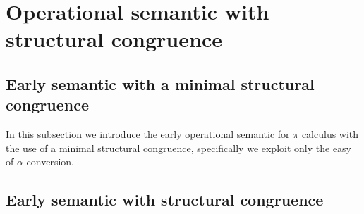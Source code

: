 


\section{Operational semantic with structural congruence}

\subsection{Early semantic with a minimal structural congruence}
In this subsection we introduce the early operational semantic for $\pi$ calculus with the use of a minimal structural congruence, specifically we exploit only the easy of $\alpha$ conversion.

\subsection{Early semantic with structural congruence}

